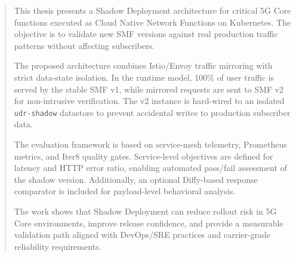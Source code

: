 \vspace{2em}
\mykeywords
\pagebreak
{
\begin{abstract}
This thesis presents a Shadow Deployment architecture for critical 5G Core functions executed as Cloud Native Network Functions on Kubernetes. The objective is to validate new SMF versions against real production traffic patterns without affecting subscribers.

The proposed architecture combines Istio/Envoy traffic mirroring with strict data-state isolation. In the runtime model, 100\% of user traffic is served by the stable SMF v1, while mirrored requests are sent to SMF v2 for non-intrusive verification. The v2 instance is hard-wired to an isolated \texttt{udr-shadow} datastore to prevent accidental writes to production subscriber data.

The evaluation framework is based on service-mesh telemetry, Prometheus metrics, and Iter8 quality gates. Service-level objectives are defined for latency and HTTP error ratio, enabling automated pass/fail assessment of the shadow version. Additionally, an optional Diffy-based response comparator is included for payload-level behavioral analysis.

The work shows that Shadow Deployment can reduce rollout risk in 5G Core environments, improve release confidence, and provide a measurable validation path aligned with DevOps/SRE practices and carrier-grade reliability requirements.
\end{abstract}
\vspace{2em}
\mykeywords
}
